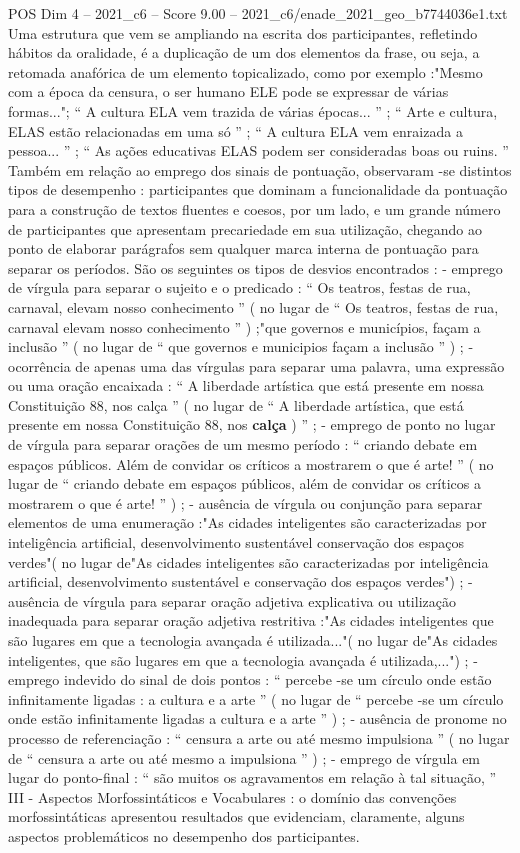 \begin{textsample}{POS Dim 4 – 2021\_c6 – Score 9.00 – 2021\_c6/enade\_2021\_geo\_b7744036e1.txt}
Uma estrutura que vem se ampliando na escrita dos participantes, refletindo hábitos da oralidade, é a duplicação de um dos elementos da frase, ou seja, a retomada anafórica de um elemento topicalizado, como por exemplo :"Mesmo com a época da censura, o ser humano ELE pode se expressar de várias formas..."; “ A cultura ELA vem trazida de várias épocas... ” ; “ Arte e cultura, ELAS estão relacionadas em uma só ” ; “ A cultura ELA vem enraizada a pessoa... ” ; “ As ações educativas ELAS podem ser consideradas boas ou ruins. ” Também em relação ao emprego dos sinais de pontuação, observaram -se distintos tipos de desempenho : participantes que dominam a funcionalidade da pontuação para a construção de textos fluentes e coesos, por um lado, e um grande número de participantes que apresentam precariedade em sua utilização, chegando ao ponto de elaborar parágrafos sem qualquer marca interna de pontuação para separar os períodos.
São os seguintes os tipos de desvios encontrados : - emprego de vírgula para separar o sujeito e o predicado : “ Os teatros, festas de rua, carnaval, elevam nosso conhecimento ” ( no lugar de “ Os teatros, festas de rua, carnaval elevam nosso conhecimento ” ) ;"que governos e municípios, façam a inclusão ” ( no lugar de “ que governos e municipios façam a inclusão ” ) ; - ocorrência de apenas uma das vírgulas para separar uma palavra, uma expressão ou uma oração encaixada : “ A liberdade artística que está presente em nossa Constituição 88, nos calça ” ( no lugar de “ A liberdade artística, que está presente em nossa Constituição 88, nos \textbf{calça} ) ” ; - emprego de ponto no lugar de vírgula para separar orações de um mesmo período : “ criando debate em espaços públicos.
Além de convidar os críticos a mostrarem o que é arte! ” ( no lugar de “ criando debate em espaços públicos, além de convidar os críticos a mostrarem o que é arte! ” ) ; - ausência de vírgula ou conjunção para separar elementos de uma enumeração :"As cidades inteligentes são caracterizadas por inteligência artificial, desenvolvimento sustentável conservação dos espaços verdes"( no lugar de"As cidades inteligentes são caracterizadas por inteligência artificial, desenvolvimento sustentável e conservação dos espaços verdes") ; - ausência de vírgula para separar oração adjetiva explicativa ou utilização inadequada para separar oração adjetiva restritiva :"As cidades inteligentes que são lugares em que a tecnologia avançada é utilizada..."( no lugar de"As cidades inteligentes, que são lugares em que a tecnologia avançada é utilizada,...") ; - emprego indevido do sinal de dois pontos : “ percebe -se um círculo onde estão infinitamente ligadas : a cultura e a arte ” ( no lugar de “ percebe -se um círculo onde estão infinitamente ligadas a cultura e a arte ” ) ; - ausência de pronome no processo de referenciação : “ censura a arte ou até mesmo impulsiona ” ( no lugar de “ censura a arte ou até mesmo a impulsiona ” ) ; - emprego de vírgula em lugar do ponto-final : “ são muitos os agravamentos em relação à tal situação, ” III - Aspectos Morfossintáticos e Vocabulares : o domínio das convenções morfossintáticas apresentou resultados que evidenciam, claramente, alguns aspectos problemáticos no desempenho dos participantes.

\end{textsample}
